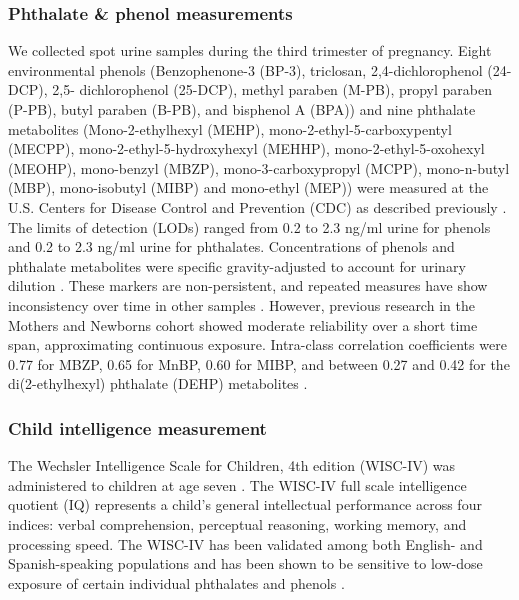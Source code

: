 \subsubsection{Phthalate \& phenol measurements}
We collected spot urine samples during the third trimester of pregnancy. Eight environmental phenols (Benzophenone-3 (BP-3), triclosan, 2,4-dichlorophenol (24-DCP), 2,5- dichlorophenol (25-DCP), methyl paraben (M-PB), propyl paraben (P-PB), butyl paraben (B-PB), and bisphenol A (BPA)) and nine phthalate metabolites (Mono-2-ethylhexyl (MEHP), mono-2-ethyl-5-carboxypentyl (MECPP), mono-2-ethyl-5-hydroxyhexyl (MEHHP), mono-2-ethyl-5-oxohexyl (MEOHP), mono-benzyl (MBZP), mono-3-carboxypropyl (MCPP), mono-n-butyl (MBP), mono-isobutyl (MIBP) and mono-ethyl (MEP)) were measured at the U.S. Centers for Disease Control and Prevention (CDC) as described previously \citep{ye2005automated, calafat2008exposure, silva2004urinary}. The limits of detection (LODs) ranged from 0.2 to 2.3 ng/ml urine for phenols and 0.2 to 2.3 ng/ml urine for phthalates. Concentrations of phenols and phthalate metabolites were specific gravity-adjusted to account for urinary dilution \citep{hauser2004temporal}. These markers are non-persistent, and repeated measures have show inconsistency over time in other samples \citep{fisher2015bisphenol}. However, previous research in the Mothers and Newborns cohort showed moderate reliability over a short time span, approximating continuous exposure. Intra-class correlation coefficients were 0.77 for MBZP, 0.65 for MnBP, 0.60 for MIBP, and between 0.27 and 0.42 for the di(2-ethylhexyl) phthalate (DEHP) metabolites \citep{whyatt2012maternal, factor2014persistent}.

\subsubsection{Child intelligence measurement}
The Wechsler Intelligence Scale for Children, 4th edition (WISC-IV) was administered to children at age seven \citep{wechsler2003}. The WISC-IV full scale intelligence quotient (IQ) represents a child's general intellectual performance across four indices: verbal comprehension, perceptual reasoning, working memory, and processing speed. The WISC-IV has been validated among both English- and Spanish-speaking populations and has been shown to be sensitive to low-dose exposure of certain individual phthalates and phenols \citep{factor2014persistent, guo2020prenatal}.

